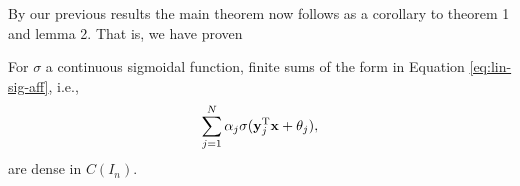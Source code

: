 \documentclass[11pt,letterpaper]{beamer}
\begin{document}
\begin{frame}
  By our previous results the main theorem now follows as a corollary to theorem
  1 and lemma 2. That is, we have proven
  \begin{theorem}
    For $\sigma$ a continuous sigmoidal function, finite sums of the form in
    Equation \eqref{eq:lin-sig-aff}, i.e.,
    \[
      \sum_{j=1}^N \alpha_j\sigma(\mathbf{y}_j^{\mathrm{T}}\mathbf{x}+\theta_j),
    \]
  are dense in $C(I_n)$.
  \end{theorem}
\end{frame}

\begin{frame}
\end{frame}

\begin{frame}
\end{frame}
\end{document}
